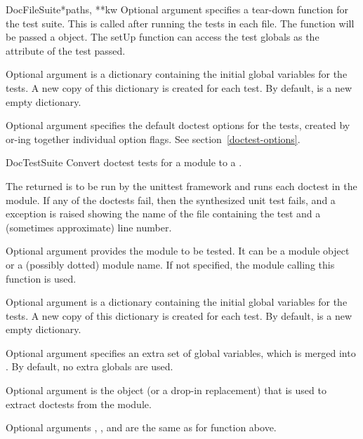 \begin{funcdesc}{DocFileSuite}{*paths, **kw}
  Optional argument  specifies a tear-down function
  for the test suite.  This is called after running the tests in each
  file.  The  function will be passed a 
  object.  The setUp function can access the test globals as the
   attribute of the test passed.

  Optional argument  is a dictionary containing the
  initial global variables for the tests.  A new copy of this
  dictionary is created for each test.  By default,  is
  a new empty dictionary.

  Optional argument  specifies the default
  doctest options for the tests, created by or-ing together
  individual option flags.  See section~\ref{doctest-options}.

\end{funcdesc}

\begin{funcdesc}{DocTestSuite}{}
  Convert doctest tests for a module to a
  .

  The returned  is to be run by the unittest
  framework and runs each doctest in the module.  If any of the doctests
  fail, then the synthesized unit test fails, and a
   exception is raised showing the name of the
  file containing the test and a (sometimes approximate) line number.

  Optional argument  provides the module to be tested.  It
  can be a module object or a (possibly dotted) module name.  If not
  specified, the module calling this function is used.

  Optional argument  is a dictionary containing the
  initial global variables for the tests.  A new copy of this
  dictionary is created for each test.  By default,  is
  a new empty dictionary.

  Optional argument  specifies an extra set of
  global variables, which is merged into .  By default, no
  extra globals are used.

  Optional argument  is the 
  object (or a drop-in replacement) that is used to extract doctests
  from the module.

  Optional arguments , , and 
  are the same as for function  above.

\end{funcdesc}

